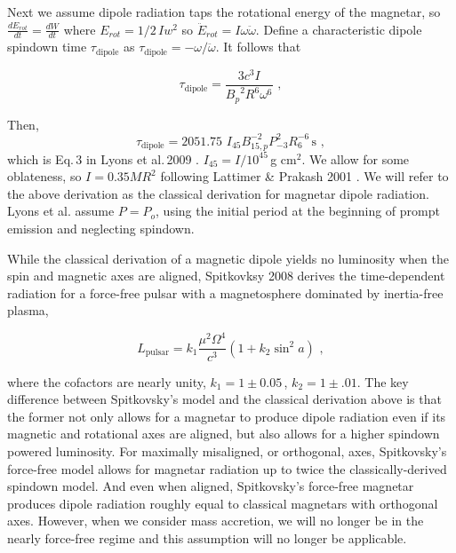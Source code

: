 \documentclass{article}
\begin{document}
Next we assume dipole radiation taps the rotational energy of the magnetar, so $\frac{dE_{rot}}{dt} = \frac{dW}{dt}$ where $E_{rot} = 1/2\, I w^2$ so $\ddot{E}_{rot} = I \omega \ddot{\omega}$. Define a characteristic dipole spindown time $\tau_{\mathrm{dipole}}$ as $\tau_{\mathrm{dipole}} = - \omega/\ddot{\omega}$.
It follows that

\begin{equation}\label{eq:tdip}\tau_{\mathrm{dipole}} = \frac{3c^3 I}{{B_p}^2 R^6 \omega^6}\,\,,
\end{equation}

Then, \begin{equation}\tau_{\mathrm{dipole}} = 2051.75\,\, I_{45} B^{-2}_{15,p} P^2_{-3} R_6^{-6}\,\mathrm{s}\,\,,\end{equation}  which is Eq.\,3 in Lyons et al.\,2009 \cite{Lyons:2009ka}. $I_{45}=I/10^{45}$\,g cm$^2$. We allow for some oblateness, so $I= 0.35 M R^2$ following Lattimer \& Prakash 2001 \cite{Lattimer:2001ap}. We will refer to the above derivation as the classical derivation for magnetar dipole radiation.
Lyons et al. assume $P=P_o$, using the initial period at the beginning of prompt emission and neglecting spindown.

While the classical derivation of a magnetic dipole yields no luminosity when the spin and magnetic axes are aligned, Spitkovksy 2008 \cite{Spitkovsky:2006np} derives the time-dependent radiation for a force-free pulsar with a magnetosphere dominated by inertia-free plasma,

\begin{equation}
L_{\mathrm{pulsar}}=k_1 \frac{\mu^2 \Omega^4}{c^3}(1+k_2 \sin^2{a})\,\,,
\end{equation}

where the cofactors are nearly unity, $k_1=1\pm 0.05$\,, $k_2=1\pm .01$. The key difference between Spitkovsky's model and the classical derivation above is that the former not only allows for a magnetar to produce dipole radiation even if its magnetic and rotational axes are aligned, but also allows for a higher spindown powered luminosity. For maximally misaligned, or orthogonal, axes, Spitkovsky's force-free model allows for magnetar radiation up to twice the classically-derived spindown model. And even when aligned, Spitkovsky's force-free magnetar produces dipole radiation roughly equal to classical magnetars with orthogonal axes.  However, when we consider mass accretion, we will no longer be in the nearly force-free regime and this assumption will no longer be applicable.
\end{document}

